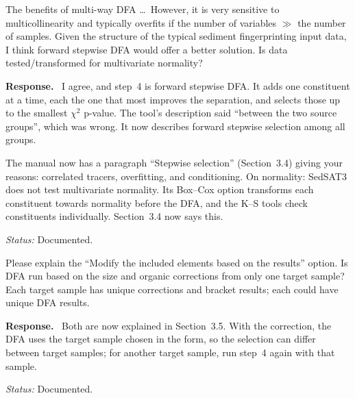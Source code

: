 \documentclass[11pt]{article}
\newcounter{cmt}
\newcounter{grp}
\renewcommand{\thecmt}{\thegrp.\arabic{cmt}}
\newenvironment{reviewer}[1]{%
  \refstepcounter{cmt}%
  \begin{tcolorbox}[enhanced,breakable,colback=commentbg,colframe=usgsgreen!60,
    boxrule=0.4pt,left=6pt,right=6pt,top=4pt,bottom=4pt,
    title={\small\textbf{Comment \thecmt}\hfill\textit{#1}},
    coltitle=black,colbacktitle=usgsgreen!15,fonttitle=\small]}%
  {\end{tcolorbox}}
\newenvironment{response}{\par\noindent\textbf{Response.}\ }{\par\medskip}
\newcommand{\status}[1]{\par\noindent\textit{Status:} #1\par}
\begin{document}
\begin{reviewer}{Multi-way discriminant function analysis}
The benefits of multi-way DFA \ldots\ However, it is very sensitive to
multicollinearity and typically overfits if the number of variables $\gg$ the
number of samples. Given the structure of the typical sediment fingerprinting
input data, I think forward stepwise DFA would offer a better solution. Is data
tested/transformed for multivariate normality?
\end{reviewer}
\begin{response}
I agree, and step~4 is forward stepwise DFA. It adds one constituent at a time,
each the one that most improves the separation, and selects those up to the
smallest $\chi^2$ p-value. The tool's description said ``between the two
source groups'', which was wrong. It now describes forward stepwise selection
among all groups.

The manual now has a paragraph ``Stepwise selection'' (Section~3.4) giving
your reasons: correlated tracers, overfitting, and conditioning. On normality:
SedSAT3 does not test multivariate normality. Its Box--Cox option transforms
each constituent towards normality before the DFA, and the K--S tools check
constituents individually. Section~3.4 now says this.
\end{response}
\status{Documented.}

\begin{reviewer}{Multi-way discriminant function analysis}
Please explain the ``Modify the included elements based on the results'' option.
Is DFA run based on the size and organic corrections from only one target
sample? Each target sample has unique corrections and bracket results; each
could have unique DFA results.
\end{reviewer}
\begin{response}
Both are now explained in Section~3.5. With the correction, the DFA uses the
target sample chosen in the form, so the selection can differ between target
samples; for another target sample, run step~4 again with that sample.
\end{response}
\status{Documented.}
\end{document}
